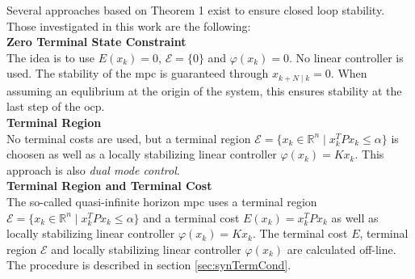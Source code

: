 \documentclass[10pt,a4paper]{article}
\begin{document}
Several approaches based on Theorem 1 exist to ensure closed loop stability. Those investigated in this work are the following:\\

\textbf{Zero Terminal State Constraint}\\
The idea is to use $E(x_k) = 0$, $\mathcal{E} = \{ 0 \}$ and $\varphi(x_{k}) = 0$. No linear controller is used.
The stability of the \gls{mpc} is guaranteed through $x_{k+N \mid k} = 0$. When assuming an equlibrium at the
origin of the system, this ensures stability at the last step of the \gls{ocp}.\\

\textbf{Terminal Region}\\
No terminal costs are used, but a terminal region $\mathcal{E} = \{x_k \in \mathbb{R}^n \mid x_k^TPx_k \leq \alpha \}$
is choosen as well as a locally stabilizing linear controller $\varphi(x_{k}) = K x_k$. This approach is also
\textit{dual mode control}.\\

\textbf{Terminal Region and Terminal Cost}\\
The so-called quasi-infinite horizon \gls{mpc} uses a terminal region $\mathcal{E} = \{x_k \in \mathbb{R}^n \mid x_k^TPx_k \leq \alpha \}$
and a terminal cost $E(x_k) = x_k^T P x_k$ as well as locally stabilizing linear controller $\varphi(x_{k}) = K x_k$.
The terminal cost $E$, terminal region $\mathcal{E}$ and locally stabilizing linear controller $\varphi(x_{k})$ are 
calculated off-line. The procedure is described in section \ref{sec:synTermCond}.
\end{document}
